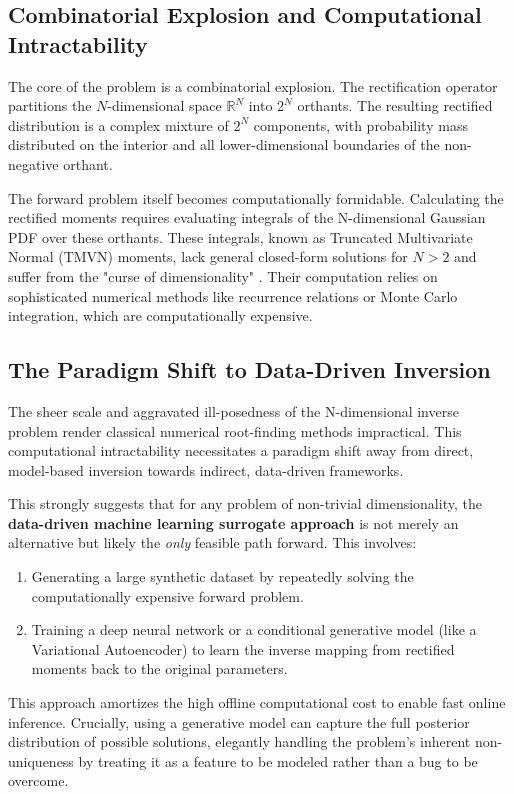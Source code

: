 \subsection{Combinatorial Explosion and Computational Intractability}
The core of the problem is a combinatorial explosion. The rectification operator partitions the $N$-dimensional space $\mathbb{R}^N$ into $2^N$ orthants. The resulting rectified distribution is a complex mixture of $2^N$ components, with probability mass distributed on the interior and all lower-dimensional boundaries of the non-negative orthant.

The forward problem itself becomes computationally formidable. Calculating the rectified moments requires evaluating integrals of the N-dimensional Gaussian PDF over these orthants. These integrals, known as Truncated Multivariate Normal (TMVN) moments, lack general closed-form solutions for $N > 2$ and suffer from the "curse of dimensionality" \cite{KanRobotti2017TruncatedMoments}. Their computation relies on sophisticated numerical methods like recurrence relations or Monte Carlo integration, which are computationally expensive.

\subsection{The Paradigm Shift to Data-Driven Inversion}
The sheer scale and aggravated ill-posedness of the N-dimensional inverse problem render classical numerical root-finding methods impractical. This computational intractability necessitates a paradigm shift away from direct, model-based inversion towards indirect, data-driven frameworks.

This strongly suggests that for any problem of non-trivial dimensionality, the \textbf{data-driven machine learning surrogate approach} is not merely an alternative but likely the \textit{only} feasible path forward. This involves:
\begin{enumerate}
    \item Generating a large synthetic dataset by repeatedly solving the computationally expensive forward problem.
    \item Training a deep neural network or a conditional generative model (like a Variational Autoencoder) to learn the inverse mapping from rectified moments back to the original parameters.
\end{enumerate}
This approach amortizes the high offline computational cost to enable fast online inference. Crucially, using a generative model can capture the full posterior distribution of possible solutions, elegantly handling the problem's inherent non-uniqueness by treating it as a feature to be modeled rather than a bug to be overcome.

